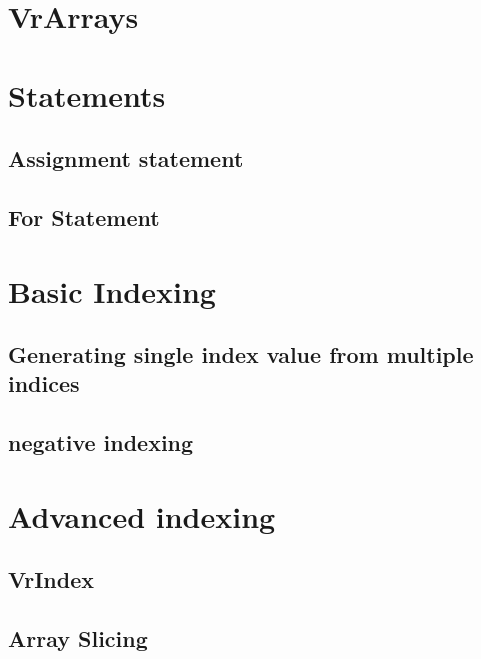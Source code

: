 \section{VrArrays}
\section{Statements}
\subsection{Assignment statement}
\subsection{For Statement}
\section{Basic Indexing}
\subsection{ Generating single index value from multiple indices}
\subsection{negative indexing}
\section{Advanced indexing}
\subsection{VrIndex}
\subsection{Array Slicing}

